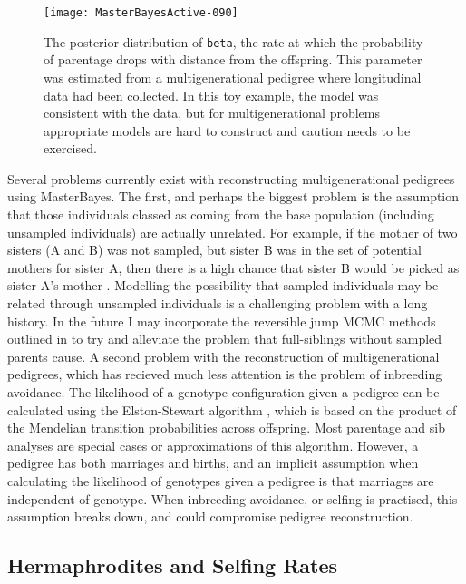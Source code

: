 \documentclass{article}
\begin{document}
\begin{figure}[!h]
\begin{center}
\texttt{[image: MasterBayesActive-090]}
\end{center}
\caption{The posterior distribution of \texttt{beta}, the rate at which the probability of parentage drops with distance from the offspring.  This parameter was estimated from a multigenerational pedigree where longitudinal data had been collected.  In this toy example, the model was consistent with the data, but for multigenerational problems appropriate models are hard to construct and caution needs to be exercised.}
\label{MGped}
\end{figure}

Several problems currently exist with reconstructing multigenerational pedigrees using MasterBayes.  The first, and perhaps the biggest problem is the assumption that those individuals classed as coming from the base population (including unsampled individuals) are actually unrelated.  For example, if the mother of two sisters (A and B) was not sampled, but sister B was in the set of potential mothers for sister A, then there is a high chance that sister B would be picked as sister A's mother \citep{Thompson.1976a}.  Modelling the possibility that sampled individuals may be related through unsampled individuals is a challenging problem with a long history. In the future I may incorporate the reversible jump MCMC methods outlined in \citet{Emery.2001} to try and alleviate the problem that full-siblings without sampled parents cause.  A second problem with the reconstruction of multigenerational pedigrees, which has recieved much less attention is the problem of inbreeding avoidance.  The likelihood of a genotype configuration given a pedigree can be calculated using the Elston-Stewart algorithm \citep{Elston.1971}, which is based on the product of the Mendelian transition probabilities across offspring.  Most parentage and sib analyses are special cases or approximations of this algorithm.  However, a pedigree has both marriages and births, and an implicit assumption when calculating the likelihood of genotypes given a pedigree is that marriages are independent of genotype. When inbreeding avoidance, or selfing is practised, this assumption breaks down, and could compromise pedigree reconstruction. 

\subsection{Hermaphrodites and Selfing Rates}
\label{Herm-sec}
\end{document}
